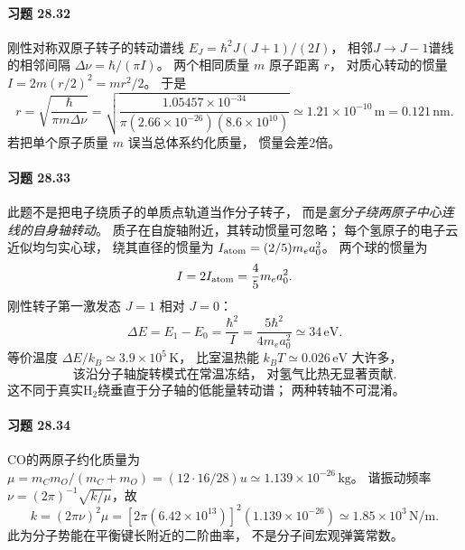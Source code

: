 \paragraph{习题 28.32}
刚性对称双原子转子的转动谱线
\(E_J=\hbar^2J(J+1)/(2I)\)，
相邻\(J\to J-1\)谱线的相邻间隔
\(\Delta\nu=\hbar/(\pi I)\)。
两个相同质量 \(m\) 原子距离 \(r\)，
对质心转动的惯量 \(I=2m(r/2)^2=mr^2/2\)。
于是
\[
\boxed{r=\sqrt{\frac{\hbar}{\pi m\Delta\nu}}
=\sqrt{\frac{1.05457\times10^{-34}}
{\pi(2.66\times10^{-26})(8.6\times10^{10})}}
\simeq1.21\times10^{-10}\,\mathrm m
=0.121\,\mathrm{nm}}.
\]
若把单个原子质量 \(m\) 误当总体系约化质量，
惯量会差2倍。

\paragraph{习题 28.33}
此题不是把电子绕质子的单质点轨道当作分子转子，
而是\emph{氢分子绕两原子中心连线的自身轴转动}。
质子在自旋轴附近，其转动惯量可忽略；
每个氢原子的电子云近似均匀实心球，
绕其直径的惯量为 \(I_{\rm atom}=(2/5)m_ea_0^2\)。
两个球的惯量为
\[
I=2I_{\rm atom}=\frac45m_ea_0^2.
\]
刚性转子第一激发态 \(J=1\) 相对 \(J=0\)：
\[
\boxed{\Delta E=E_1-E_0=\frac{\hbar^2}{I}
=\frac{5\hbar^2}{4m_ea_0^2}
\simeq34\,\mathrm{eV}}.
\]
等价温度 \(\Delta E/k_B\simeq3.9\times10^5\,\mathrm K\)，
比室温热能 \(k_BT\simeq0.026\,\mathrm{eV}\) 大许多，
\[
\boxed{\text{该沿分子轴旋转模式在常温冻结，
对氢气比热无显著贡献}}.
\]
这不同于真实H$_2$绕垂直于分子轴的低能量转动谱；
两种转轴不可混淆。

\paragraph{习题 28.34}
CO的两原子约化质量为
\(\mu=m_Cm_O/(m_C+m_O)
=(12\cdot16/28)u\simeq1.139\times10^{-26}\,\mathrm{kg}\)。
谐振动频率
\(\nu=(2\pi)^{-1}\sqrt{k/\mu}\)，故
\[
\boxed{k=(2\pi\nu)^2\mu
=[2\pi(6.42\times10^{13})]^2
(1.139\times10^{-26})
\simeq1.85\times10^3\,\mathrm{N/m}}.
\]
此为分子势能在平衡键长附近的二阶曲率，
不是分子间宏观弹簧常数。
